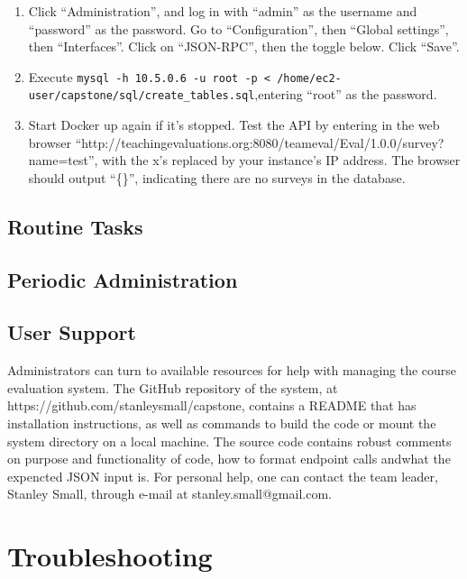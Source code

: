 \documentclass{article}
\begin{document}
\begin{enumerate}
    \item Click ``Administration'', and log in with ``admin'' as the username and ``password'' as the password. Go to ``Configuration'', then ``Global settings'', then ``Interfaces''. Click on ``JSON-RPC'', then the toggle below. Click ``Save''.

    \item Execute \verb|mysql -h 10.5.0.6 -u root -p < /home/ec2-user/capstone/sql/create_tables.sql|,\newline entering ``root'' as the password.

    \item Start Docker up again if it's stopped. Test the API by entering in the web browser ``http://\newline teachingevaluations.org:8080/teameval/Eval/1.0.0/survey?name=test'', with the x’s replaced by your instance’s IP address. The browser should output ``\{\}'', indicating there are no surveys in the database.
\end{enumerate}

\subsection{Routine Tasks}



\subsection{Periodic Administration}



\subsection{User Support}

Administrators can turn to available resources for help with managing the course evaluation system. The GitHub repository of the system, at https://github.com/stanleysmall/capstone, contains a README that has installation instructions, as well as commands to build the code or mount the system directory on a local machine. The source code contains robust comments on purpose and functionality of code, how to format endpoint calls andwhat the expencted JSON input is. For personal help, one can contact the team leader, Stanley Small, through e-mail at stanley.small@gmail.com.

\section{Troubleshooting}
\end{document}
